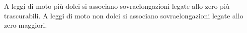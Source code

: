 A leggi di moto più dolci si associano sovraelongazioni legate allo zero più trascurabili. A leggi di moto non dolci si associano sovraelongazioni legate allo zero maggiori.

